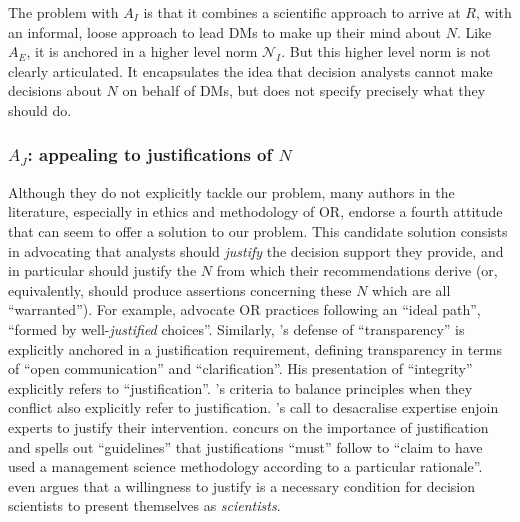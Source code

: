 \documentclass[preprint, french, english, 11pt, authoryear]{elsarticle}%
\newcommand{\protectforpdf}[1]{\texorpdfstring{\ensuremath{#1}}{#1}}
\newcommand{\possessivecite}[1]{\citeauthor{#1}’s \citeyearpar{#1}}
\begin{document}
The problem with $A_I$ is that it combines a scientific approach to arrive at $R$, with an informal, loose approach to lead \acp{DM} to make up their mind about $N$.
Like $A_E$, it is anchored in a higher level norm $\mathscr{N}_I$. But this higher level norm is not clearly articulated. It encapsulates the idea that decision analysts cannot make decisions about $N$ on behalf of \acp{DM}, but does not specify precisely what they should do.


\begin{changebar}
\subsubsection{\texorpdfstring{$A_J$}{AJ}: appealing to justifications of \protectforpdf{N}}



Although they do not explicitly tackle our problem, many authors in the literature, especially in ethics and methodology of \ac{OR},
endorse a fourth attitude that can seem to offer a solution to our problem. This candidate solution consists in advocating that analysts should \emph{justify} the decision support they provide, and in particular should justify the $N$ from which their recommendations derive (or, equivalently, should produce assertions concerning these $N$ which are all ``warranted'').
For example, \citet{lahtinen_why_2017} advocate \ac{OR} practices following an ``ideal path'', ``formed by well-\emph{justified} choices''.
Similarly, \possessivecite{diekmann_moral_2013} defense of ``transparency'' is explicitly anchored in a justification requirement, defining transparency in terms of ``open communication'' and ``clarification''. His presentation of ``integrity'' explicitly refers to ``justification''.
 \possessivecite{beauchamp_principles_2009} criteria to balance principles when they conflict also explicitly refer to justification.
\possessivecite{white_death_1994} call to desacralise expertise enjoin experts to justify their intervention.
\citet{jackson_towards_1999} concurs on the importance of justification and spells out ``guidelines'' that justifications ``must'' follow to “claim to have used a management science methodology according to a particular rationale''.
\citet{ormerod_justifying_2010} even argues that a willingness to justify is a necessary condition for decision scientists to present themselves as \emph{scientists}.
\end{changebar}
 
\end{document}
